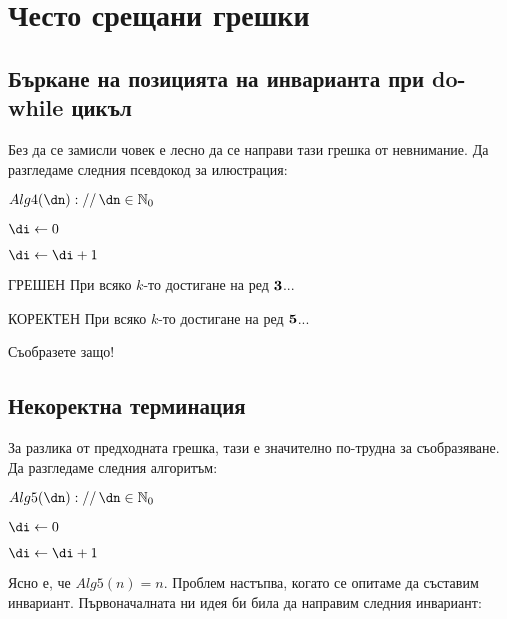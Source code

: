 \section{Често срещани грешки}

\subsection{Бъркане на позицията на инварианта при do-while цикъл}

Без да се замисли човек е лесно да се направи тази грешка от невнимание. Да разгледаме следния псевдокод за илюстрация:

\begin{pseudocode}
	
	$Alg4(\dn)://\,\dn\in\mathbb{N}_0$
	\Mybegin
	{
		$\di\leftarrow0$\;
		
		\Do{$\di<\dn$}
		{
			$\di\leftarrow\di+1$\;
		}
	
		\KwRet{$\dn$\;}
	}
\end{pseudocode}

\begin{boxinvariant*}{ГРЕШЕН}{}
	При всяко $k$-то достигане на ред $\textbf3$...
\end{boxinvariant*}
\vspace{0.3cm}
\begin{boxinvariant*}{КОРЕКТЕН}{}
	При всяко $k$-то достигане на ред $\textbf5$...
\end{boxinvariant*}
\vspace{0.3cm}\noindent
Съобразете защо!\newpage

\subsection{Некоректна терминация}

За разлика от предходната грешка, тази е значително по-трудна за съобразяване. Да разгледаме следния алгоритъм:
\begin{pseudocode}
	
	$Alg5(\dn)://\,\dn\in\mathbb{N}_0$
	\Mybegin
	{
		$\di\leftarrow0$\;
		
		\While{$\di<\dn$}
		{
			$\di\leftarrow\di+1$\;
		}
		
		\KwRet{$\dn$\;}
	}
\end{pseudocode}
Ясно е, че $Alg5(n)=n$. Проблем настъпва, когато се опитаме да съставим инвариант. Първоначалната ни идея би била да направим следния инвариант:

